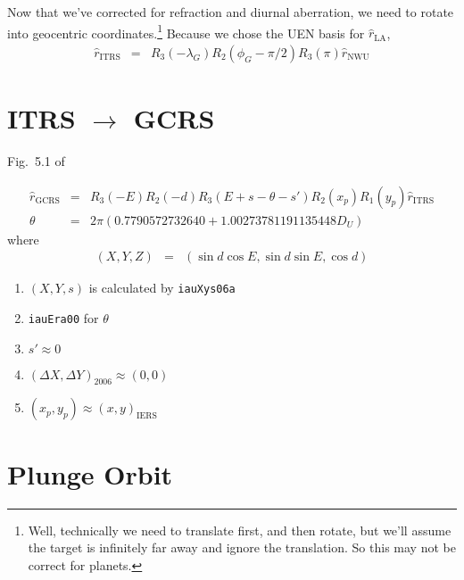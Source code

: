 \documentclass[10pt,preprint]{aastex}
\newcommand{\rhat}{{\hat r}}
\newcommand{\ITRS}{\mathrm{ITRS}}
\newcommand{\GCRS}{\mathrm{GCRS}}
\newcommand{\JD}{\mathrm{JD}}
\newcommand{\UTone}{\mathrm{UT1}}
\newcommand{\ENU}{\mathrm{ENU}}
\newcommand{\NWU}{\mathrm{NWU}}
\newcommand{\LA}{\mathrm{LA}}
\newcommand{\IERS}{\mathrm{IERS}}
\begin{document}
Now that we've corrected for refraction and diurnal aberration, we need to rotate into geocentric
coordinates.\footnote{Well, technically we need to translate first, and then rotate, but we'll assume the target is
infinitely far away and ignore the translation. So this may not be correct for planets.}
Because we chose the UEN basis for $\rhat_\LA$,
\begin{eqnarray}
\rhat_\ITRS &=& R_3(-\lambda_G) R_2(\phi_G-\pi/2) R_3(\pi) \rhat_\NWU
\end{eqnarray}

\section{ITRS $\to$ GCRS}

Fig.~5.1 of \cite{iers2010}

\begin{eqnarray}
\rhat_\GCRS &=& R_3(-E) R_2(-d) R_3(E + s - \theta - s')R_2(x_p)R_1(y_p) \rhat_\ITRS \\
\theta &=& 2\pi(0.7790572732640 + 1.00273781191135448 D_U)
\end{eqnarray}
where
\begin{eqnarray}
(X,Y,Z) &=& (\sin d \cos E, \sin d \sin E, \cos d)
\end{eqnarray}
\begin{enumerate}
\item $(X,Y,s)$ is calculated by \texttt{iauXys06a}
\item \texttt{iauEra00} for $\theta$
\item $s'\approx0$
\item $(\Delta X,\Delta Y)_{2006} \approx (0,0)$
\item $(x_p,y_p) \approx (x,y)_\IERS$
\end{enumerate}

\section{Plunge Orbit}
\end{document}
